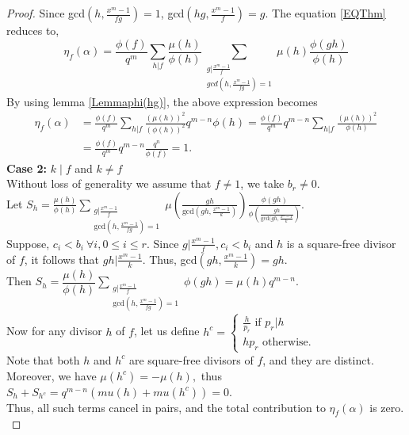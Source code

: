 \documentclass[10pt,a4paper]{amsart}
\begin{document}
\begin{proof}
         Since gcd$(h,\frac{x^m-1}{fg}) = 1$, gcd$(hg,\frac{x^m-1}{f})=g$. The equation \ref{EQThm} reduces to,
         $$\eta_f(\alpha)= \frac{\phi(f)}{q^m}\sum_{h\vert f} \frac{\mu(h)}{\phi(h)} \sum_{\substack{g \vert \frac{x^m-1}{f}\\ gcd(h,\frac{x^m-1}{fg}) =1} } \mu(h) \frac{\phi(gh)}{\phi(h)} $$
         By using lemma \ref{Lemmaphi(hg)}, the above expression becomes
         \begin{align*}
             \eta_f(\alpha) &=\frac{\phi(f)}{q^m}\sum_{h\vert f} \frac{(\mu(h))^2}{(\phi(h))^2}q^{m-n}\phi(h)=\frac{\phi(f)}{q^m}q^{m-n}\sum_{h\vert f} \frac{(\mu(h))^2}{\phi(h)} \\
             & =\frac{\phi(f)}{q^m}q^{m-n}\frac{q^n}{\phi(f)} = 1.
         \end{align*}
         \textbf{Case 2:} $k \mid f$ and $k \neq f$\\
         Without loss of generality we assume that $f \neq 1$, we take $b_r \neq 0$.\\
        Let $S_h = \displaystyle\frac{\mu(h)}{\phi(h)}\sum_{\substack{g \vert \frac{x^m-1}{f} \\ \text{gcd}(h,\frac{x^m-1}{fg})=1}} \mu\left( \frac{gh}{\text{gcd}(gh,\frac{x^m-1}{k})}\right)\frac{\phi(gh)}{\phi\left( \frac{gh}{\text{gcd}(gh,\frac{x^m-1}{k}}\right)}$.\\
        Suppose, $c_i<b_i ~ \forall i, 0 \leq i \leq r.$
        Since $g \vert \frac{x^m-1}{f}, c_i<b_i$ and $h$ is a square-free divisor of $f$, it follows that $gh \vert \frac{x^m-1}{k}$. Thus, gcd$(gh,\frac{x^m-1}{k})= gh.$\\
        Then $S_h = \dfrac{\mu(h)}{\phi(h)} \displaystyle \sum_{\substack{g \vert \frac{x^m-1}{f} \\ \text{gcd}(h,\frac{x^m-1}{fg})=1}} \phi(gh) = \mu(h) q^{m-n}$.\\
        Now for any divisor $h$ of $f$, let us define $h^c = \begin{cases}
            \frac{h}{p_r} \text{ if } p_r \vert h \\
            hp_r \text{ otherwise}.
        \end{cases}$\\
        Note that both $h$ and $h^c$ are square-free divisors of $f$, and they are distinct. Moreover, we have $\mu(h^c) = -\mu(h),$
        thus $S_h + S_{h^c} = q^{m-n}(mu(h) + mu(h^c)) = 0$.\\
        Thus, all such terms cancel in pairs, and the total contribution to $\eta_f(\alpha)$ is zero.\\

\end{proof}
\end{document}
